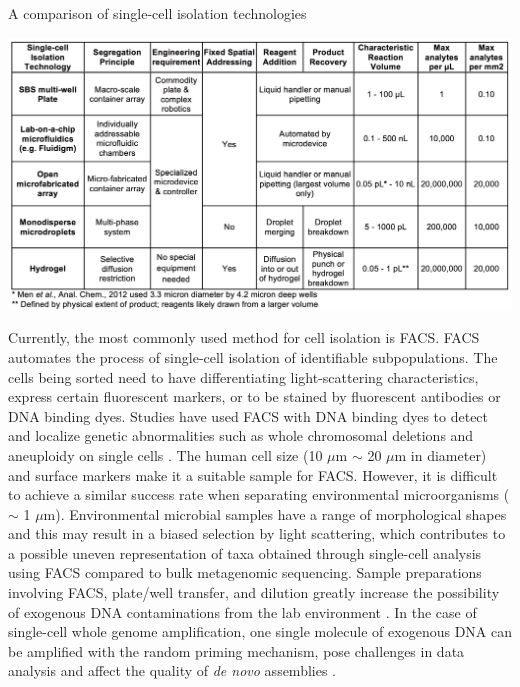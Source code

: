 \begin{table}[ht!]
\caption{A comparison of single-cell isolation technologies}
\label{tab:singlecellisolation}
\includegraphics[width=\linewidth]{./figures/TechnologyComparisons.png}
\end{table}

Currently, the most commonly used method for cell isolation is FACS. FACS automates the process of single-cell isolation of identifiable subpopulations. The cells being sorted need to have differentiating light-scattering characteristics, express certain fluorescent markers, or to be stained by fluorescent antibodies or DNA binding dyes. Studies have used FACS with DNA binding dyes to detect and localize genetic abnormalities such as whole chromosomal deletions and aneuploidy on single cells \cite{Trask:2002iy}. The human cell size (10 $\mu$m $\sim$ 20 $\mu$m in diameter) and surface markers make it a suitable sample for FACS. However, it is difficult to achieve a similar success rate when separating environmental microorganisms ($\sim$ 1 $\mu$m). Environmental microbial samples have a range of morphological shapes and this may result in a biased selection by light scattering, which contributes to a possible uneven representation of taxa obtained through single-cell analysis using FACS compared to bulk metagenomic sequencing. Sample preparations involving FACS, plate/well transfer, and dilution greatly increase the possibility of exogenous DNA contaminations from the lab environment \cite{Woyke:2011eg}. In the case of single-cell whole genome amplification, one single molecule of exogenous DNA can be amplified with the random priming mechanism, pose challenges in data analysis and affect the quality of \textit{de novo} assemblies \cite{Blainey:2011dt}.

